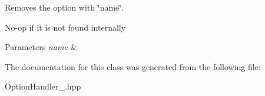 Removes the option with \char`\"{}name\char`\"{}.

No-\/op if it is not found internally
\begin{DoxyParams}{Parameters}
{\em name}
    & \\
    \hline
\end{DoxyParams}


The documentation for this class was generated from the following file\+:\begin{DoxyCompactItemize}
                                                                             \item
                                                                             Option\+Handler\+\_\+.\+hpp
\end{DoxyCompactItemize}
